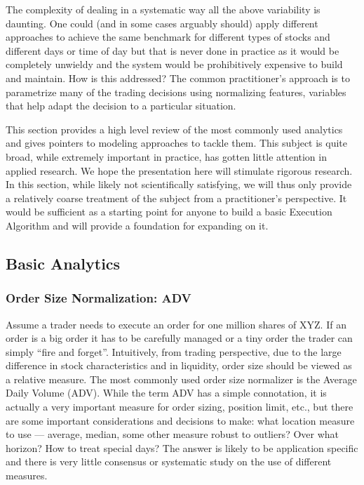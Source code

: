 The complexity of dealing in a systematic way all the above variability is  daunting. One could (and in some cases arguably should) apply different approaches to achieve the same benchmark for different types of stocks and different days or time of day but that is never done in practice as it would be completely unwieldy and the system would be prohibitively expensive to build and maintain. How is this addressed? The common practitioner's approach is to parametrize many of the trading decisions using normalizing features, variables that help adapt the decision to a particular situation. 


This section provides a high level review of the most commonly used analytics and gives pointers to modeling approaches to tackle them. This subject is quite broad, while extremely important in practice, has gotten little attention in applied research. We hope the presentation here will stimulate rigorous research. In this section, while likely not scientifically satisfying, we  will thus only provide a relatively coarse treatment of the subject from a practitioner's perspective. It would be sufficient as a starting point for anyone to build a basic Execution Algorithm and will provide a foundation for expanding on it.


\subsection{Basic Analytics}
\subsubsection{Order Size Normalization: ADV}
Assume a trader needs to execute an order for one million shares of XYZ. If an order is a big order it has to be carefully managed or a tiny order the trader can simply ``fire and forget''.  Intuitively, from trading perspective, due to  the large difference in stock characteristics and in liquidity, order size should be viewed as a relative measure. The most commonly used order size normalizer is the Average Daily Volume (ADV). While the term ADV has a simple connotation, it is actually a very important measure for order sizing, position limit, etc., but there are some important considerations and decisions to make: what location measure to use --- average, median, some other measure robust to outliers? Over what horizon? How to treat special days? The answer is likely to be application specific and there is very little consensus or systematic study on the use of different measures.
 	
